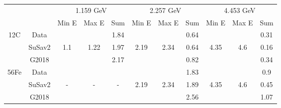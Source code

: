 \documentclass[a4paper]{article}
\begin{document}
\begin{table}[]
\begin{tabular}{|c|c|c|c|c|c|c|c|c|c|c|}
\hline
\multicolumn{2}{|c|}{\multirow{2}{*}{}} & \multicolumn{3}{c|}{1.159 GeV} & \multicolumn{3}{c|}{2.257 GeV} & \multicolumn{3}{c|}{4.453 GeV} \\ \cline{3-11} 
\multicolumn{2}{|c|}{}                  & Min E  & Max E   & Sum    & Min E     & Max E     & Sum    & Min E     & Max E     & Sum    \\ \hline
\multirow{3}{*}{12C}       & Data       &        &         & 1.84   &           &           & 0.64       &      &      & 0.31  \\
                           & SuSav2     & 1.1    &  1.22   & 1.97   & 2.19      & 2.34      & 0.64       & 4.35 & 4.6  & 0.16  \\
                           & G2018      &        &         & 2.17   &           &           & 0.82       &      &      & 0.34  \\ \hline
\multirow{3}{*}{56Fe}      & Data       &        &         &        &           &           & 1.83       &      &      & 0.9    \\
                           & SuSav2     & -      &  -      &   -    & 2.19      & 2.34      & 1.89       & 4.35 & 4.6  & 0.45   \\
                           & G2018      &        &         &        &           &           & 2.56       &      &      & 1.07  \\ \hline
\end{tabular}
\end{table}
    
	
\end{document}
